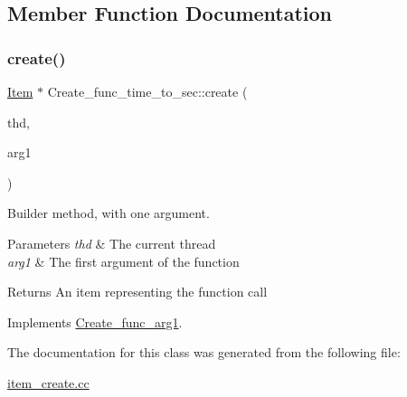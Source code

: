 \subsection{Member Function Documentation}
\mbox{\label{classCreate__func__time__to__sec_ab20d8dd5c9b411f9e9f59b17f781798c}} 
\subsubsection{\texorpdfstring{create()}{create()}}
{\footnotesize\ttfamily \mbox{\hyperlink{classItem}{Item}} $\ast$ Create\+\_\+func\+\_\+time\+\_\+to\+\_\+sec\+::create (\begin{DoxyParamCaption}\item[{T\+HD $\ast$}]{thd,  }\item[{\mbox{\hyperlink{classItem}{Item}} $\ast$}]{arg1 }\end{DoxyParamCaption})\hspace{0.3cm}{\ttfamily [virtual]}}

Builder method, with one argument. 
\begin{DoxyParams}{Parameters}
{\em thd} & The current thread \\
\hline
{\em arg1} & The first argument of the function \\
\hline
\end{DoxyParams}
\begin{DoxyReturn}{Returns}
An item representing the function call 
\end{DoxyReturn}


Implements \mbox{\hyperlink{classCreate__func__arg1_a3e9a98f755cd82c3e762e334c955a8c9}{Create\+\_\+func\+\_\+arg1}}.



The documentation for this class was generated from the following file\+:\begin{DoxyCompactItemize}
\item 
\mbox{\hyperlink{item__create_8cc}{item\+\_\+create.\+cc}}\end{DoxyCompactItemize}
